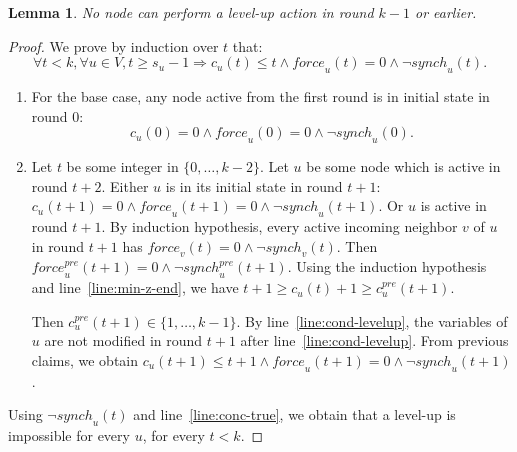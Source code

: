\documentclass[11pt,letterpaper]{article}
\newtheorem{lem}[thm]{Lemma}
\begin{document}
\begin{lem} \label{lem:early-phase}
	No node can perform a level-up action in round $k-1$ or earlier.
\end{lem}
\begin{proof}
	We prove by induction over $t$ that:
	$$\forall t < k, \forall u \in V, t \geq s_u-1 \Rightarrow c_u(t) \leq t \wedge \mathit{force}_u(t) = 0 \wedge \neg \mathit{synch}_u(t).$$
	\begin{enumerate}
		\item For the base case, any node active from the first round is in initial state in round 0:
			$$c_u(0) = 0 \wedge \mathit{force}_u(0) = 0 \wedge \neg \mathit{synch}_u(0).$$
		\item Let $t$ be some integer in $\{0, \dots, k-2\}$. Let $u$ be some node which is active in round $t+2$.
			Either $u$ is in its initial state in round $t+1$: $c_u(t+1) = 0 \wedge \mathit{force}_u(t+1) = 0 \wedge \neg \mathit{synch}_u(t+1)$.
			Or $u$ is active in round $t+1$.
			By induction hypothesis, every active incoming neighbor $v$ of $u$ in round $t+1$ has $\mathit{force}_v(t) = 0 \wedge \neg \mathit{synch}_v(t)$.
			Then $\mathit{force}_u^{pre}(t+1) = 0 \wedge \neg \mathit{synch}_u^{pre}(t+1)$.
			Using the induction hypothesis and line~\ref{line:min-z-end}, we have
			$t+1 \geq c_u(t)+1 \geq c_u^{pre}(t+1)$.

			Then $c_u^{pre}(t+1) \in \{1, \dots, k-1\}$.
			By line~\ref{line:cond-levelup}, the variables of $u$ are not modified in round $t+1$ after line~\ref{line:cond-levelup}.
			From previous claims, we obtain $c_u(t+1) \leq t+1 \wedge \mathit{force}_u(t+1) = 0 \wedge \neg \mathit{synch}_u(t+1)$.
	\end{enumerate}
	Using $\neg \mathit{synch}_u(t)$ and line~\ref{line:conc-true}, we obtain that a level-up is impossible for every $u$, for every $t < k$.
\end{proof}
\end{document}
